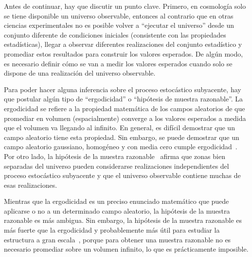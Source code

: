 Antes de continuar, hay que discutir un punto clave. Primero, en cosmología solo se tiene disponible un universo observable, entonces al contrario que en otras ciencias experimentales no es posible volver a ``ejecutar el universo'' desde un conjunto diferente de condiciones iniciales (consistente con las propiedades estadísticas), llegar a observar diferentes realizaciones del conjunto estadístico y promediar estos resultados para construir los valores esperados. De algún modo, es necesario definir cómo se van a medir los valores esperados cuando solo se dispone de una realización del universo observable.

Para poder hacer alguna inferencia sobre el proceso estocástico subyacente, hay que postular algún tipo de ``ergodicidad'' o ``hipótesis de muestra razonable''. La ergodicidad se refiere a la propiedad matemática de los campos aleatorios de que promediar en volumen (espacialmente) converge a los valores esperados a medida que el volumen va llegando al infinito. En general, es difícil demostrar que un campo aleatorio tiene esta propiedad. Sin embargo, se puede demostrar que un campo aleatorio gaussiano, homogéneo y con media cero cumple ergodicidad~\cite{adler1981}. Por otro lado, la hipótesis de la muestra razonable~\cite{peebles1980large} afirma que zonas bien separadas del universo pueden considerarse realizaciones independientes del proceso estocástico subyacente y que el universo observable contiene muchas de esas realizaciones.

Mientras que la ergodicidad es un preciso enunciado matemático que puede aplicarse o no a un determinado campo aleatorio, la hipótesis de la muestra razonable es más ambigua. Sin embargo, la hipótesis de la muestra razonable es más fuerte que la ergodicidad y probablemente más útil para estudiar la estructura a gran escala~\cite{watts2003statistical}, porque para obtener una muestra razonable no es necesario promediar sobre un volumen infinito, lo que es prácticamente imposible.
